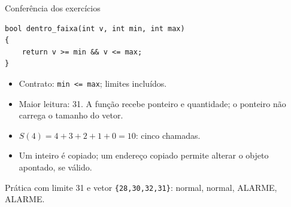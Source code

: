 \begin{frame}[fragile]{Conferência dos exercícios}
\begin{lstlisting}
bool dentro_faixa(int v, int min, int max)
{
    return v >= min && v <= max;
}
\end{lstlisting}
\begin{itemize}
\item Contrato: \texttt{min <= max}; limites incluídos.
\item Maior leitura: 31. A função recebe ponteiro e quantidade; o ponteiro não carrega o tamanho do vetor.
\item $S(4)=4+3+2+1+0=10$: cinco chamadas.
\item Um inteiro é copiado; um endereço copiado permite alterar o objeto apontado, se válido.
\end{itemize}
\small Prática com limite 31 e vetor \texttt{\{28,30,32,31\}}: normal, normal, ALARME, ALARME.
\end{frame}
